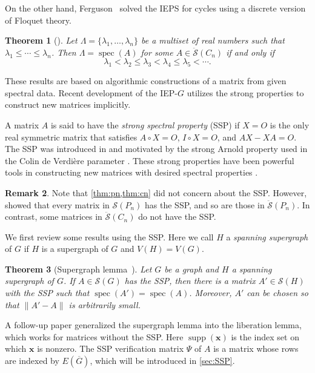 \documentclass{article}
\newtheorem{theorem}{Theorem}[section]
\theoremstyle{definition}
\newtheorem{remark}[theorem]{Remark}
\newcommand{\bx}{\mathbf{x}}
\newcommand{\spec}{\operatorname{spec}}
\newcommand{\mptn}{\mathcal{S}}
\newcommand{\mdso}{\ddot{\mathcal{S}}}
\newcommand{\vsupp}{\operatorname{supp}}
\begin{document}
On the other hand, Ferguson~\cite{Ferguson80} solved the IEPS for cycles using a discrete version of Floquet theory.

\begin{theorem}[\cite{Ferguson80}]
\label{thm:cn}
Let $\Lambda = \{\lambda_1, \ldots, \lambda_n\}$ be a multiset of real numbers such that $\lambda_1 \leq \cdots \leq \lambda_n$.  Then $\Lambda = \spec(A)$ for some $A\in\mdso(C_n)$ if and only if 
\[
    \lambda_1 < \lambda_2 \leq \lambda_3 < \lambda_4 \leq \lambda_5 < \cdots .
\]
\end{theorem}

These results are based on algorithmic constructions of a matrix from given spectral data.  Recent development of the IEP-$G$ utilizes the strong properties to construct new matrices implicitly.  

A matrix $A$ is said to have the \emph{strong spectral property} (SSP) if $X = O$ is the only real symmetric matrix that satisfies $A\circ X = O$, $I\circ X = O$, and $AX - XA = O$.  The SSP was introduced in \cite{gSAP} and motivated by the strong Arnold property used in the Colin de Verdi\`ere parameter \cite{CdV, CdVF}.  These strong properties have been powerful tools in constructing new matrices with desired spectral properties \cite{gSAP, IEPG2, IEPGZF22}.  

\begin{remark}
\label{rem:ssppc}
Note that \cref{thm:pn,thm:cn} did not concern about the SSP.  However, \cite{Gssp} showed that every matrix in $\mptn(P_n)$ has the SSP, and so are those in $\mdso(P_n)$.  In contrast, some matrices in $\mdso(C_n)$ do not have the SSP.
\end{remark}

We first review some results using the SSP.  Here we call $H$ a \emph{spanning supergraph} of $G$ if $H$ is a supergraph of $G$ and $V(H) = V(G)$.  

\begin{theorem}[Supergraph lemma~\cite{gSAP}]
\label{thm:super}
Let $G$ be a graph and $H$ a spanning supergraph of $G$.  If $A\in\mptn(G)$ has the SSP, then there is a matrix $A'\in\mptn(H)$ with the SSP such that $\spec(A') = \spec(A)$.  Moreover, $A'$ can be chosen so that $\|A' - A\|$ is arbitrarily small.
\end{theorem}

A follow-up paper \cite{IEPG2} generalized the supergraph lemma into the liberation lemma, which works for matrices without the SSP\@.  Here $\vsupp(\bx)$ is the index set on which $\bx$ is nonzero.  The SSP verification matrix $\Psi$ of $A$ is a matrix whose rows are indexed by $E(\overline{G})$, which will be introduced in \cref{sec:SSP}.  
\end{document}
